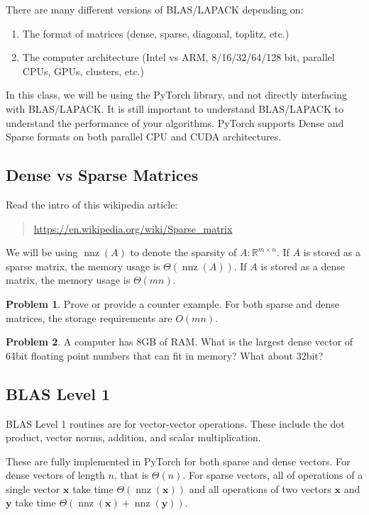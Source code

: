\documentclass[10pt]{article}
\theoremstyle{definition}
\newtheorem{problem}{Problem}
\newcommand{\R}{\mathbb R}
\DeclareMathOperator{\nnz}{nnz}
\newcommand{\x}{\mathbf x}
\newcommand{\y}{\mathbf y}
\begin{document}
There are many different versions of BLAS/LAPACK depending on:
\begin{enumerate}
    \item The format of matrices (dense, sparse, diagonal, toplitz, etc.)
    \item The computer architecture (Intel vs ARM, 8/16/32/64/128 bit, parallel CPUs, GPUs, clusters, etc.)
\end{enumerate}
In this class, we will be using the PyTorch library,
and not directly interfacing with BLAS/LAPACK.
It is still important to understand BLAS/LAPACK to understand the performance of your algorithms.
PyTorch supports Dense and Sparse formats on both parallel CPU and CUDA architectures.

\subsection{Dense vs Sparse Matrices}

Read the intro of this wikipedia article:
\begin{quote}
    \url{https://en.wikipedia.org/wiki/Sparse_matrix}
\end{quote}
We will be using $\nnz(A)$ to denote the sparsity of $A:\R^{m\times n}$.
If $A$ is stored as a sparse matrix,
the memory usage is $\Theta(\nnz(A))$.
If $A$ is stored as a dense matrix,
the memory usage is $\Theta(mn)$.

\begin{problem}
    Prove or provide a counter example.
    For both sparse and dense matrices,
    the storage requirements are $O(mn)$.
    \vspace{1in}
\end{problem}

\begin{problem}
    A computer has 8GB of RAM.
    What is the largest dense vector of 64bit floating point numbers that can fit in memory?
    What about 32bit?
    \vspace{1in}
\end{problem}

\subsection{BLAS Level 1}

BLAS Level 1 routines are for vector-vector operations.
These include the dot product, vector norms, addition, and scalar multiplication.

These are fully implemented in PyTorch for both sparse and dense vectors.
For dense vectors of length $n$, that is $\Theta(n)$.
For sparse vectors, all of operations of a single vector $\x$ take time $\Theta(\nnz(\x))$
and all operations of two vectors $\x$ and $\y$ take time $\Theta(\nnz(\x)+\nnz(\y))$.
\end{document}
